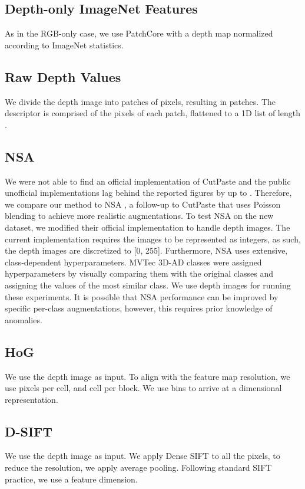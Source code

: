 \documentclass{article}
\begin{document}
\subsection{Depth-only ImageNet Features} As in the RGB-only case, we use PatchCore with a depth map normalized according to ImageNet statistics.

\subsection{Raw Depth Values} We divide the depth image into patches of  pixels, resulting in  patches. The descriptor is comprised of the  pixels of each patch, flattened to a 1D list of length .

\subsection{NSA} We were not able to find an official implementation of CutPaste \cite{cutpaste} and the public unofficial implementations lag behind the reported figures by up to . Therefore, we compare our method to NSA \cite{nsa}, a follow-up to CutPaste that uses Poisson blending \cite{poisson_blending} to achieve more realistic augmentations. To test NSA on the new dataset, we modified their official implementation to handle depth images. The current implementation requires the images to be represented as integers, as such, the depth images are discretized to [0, 255]. Furthermore, NSA uses extensive, class-dependent hyperparameters. MVTec 3D-AD classes were assigned hyperparameters by visually comparing them with the original classes and assigning the values of the most similar class. We use depth images for running these experiments. It is possible that NSA performance can be improved by specific per-class augmentations, however, this requires prior knowledge of anomalies.

\subsection{HoG} We use the depth image as input. To align with the feature map resolution, we use  pixels per cell, and  cell per block. We use  bins to arrive at a  dimensional representation.

\subsection{D-SIFT} We use the depth image as input. We apply Dense SIFT to all the pixels, to reduce the resolution, we apply average pooling. Following standard SIFT practice, we use a  feature dimension.
\end{document}
